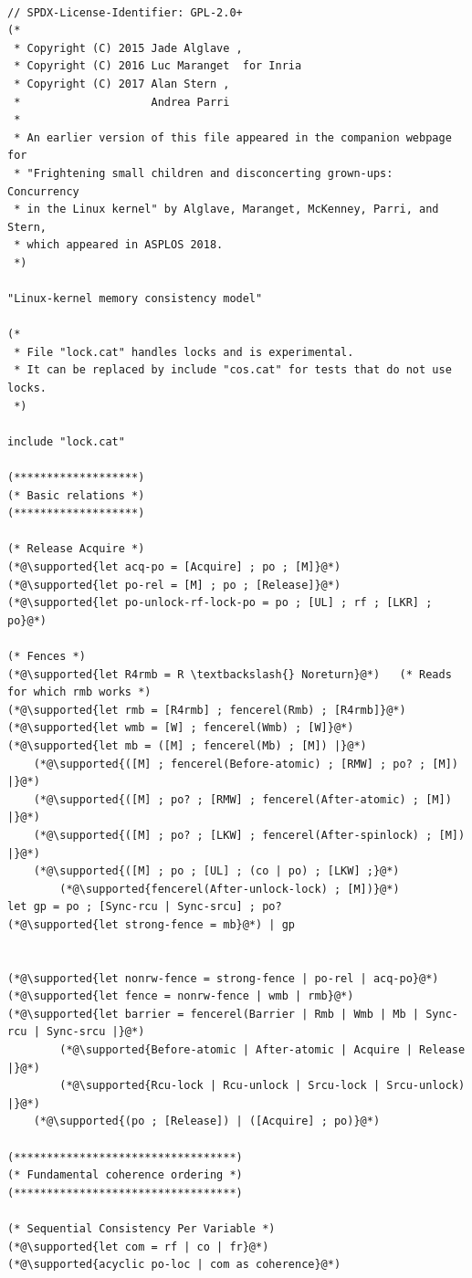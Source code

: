 \begin{lstlisting}

// SPDX-License-Identifier: GPL-2.0+
(*
 * Copyright (C) 2015 Jade Alglave ,
 * Copyright (C) 2016 Luc Maranget  for Inria
 * Copyright (C) 2017 Alan Stern ,
 *                    Andrea Parri
 *
 * An earlier version of this file appeared in the companion webpage for
 * "Frightening small children and disconcerting grown-ups: Concurrency
 * in the Linux kernel" by Alglave, Maranget, McKenney, Parri, and Stern,
 * which appeared in ASPLOS 2018.
 *)

"Linux-kernel memory consistency model"

(*
 * File "lock.cat" handles locks and is experimental.
 * It can be replaced by include "cos.cat" for tests that do not use locks.
 *)

include "lock.cat"

(*******************)
(* Basic relations *)
(*******************)

(* Release Acquire *)
(*@\supported{let acq-po = [Acquire] ; po ; [M]}@*)
(*@\supported{let po-rel = [M] ; po ; [Release]}@*)
(*@\supported{let po-unlock-rf-lock-po = po ; [UL] ; rf ; [LKR] ; po}@*)

(* Fences *)
(*@\supported{let R4rmb = R \textbackslash{} Noreturn}@*)	(* Reads for which rmb works *)
(*@\supported{let rmb = [R4rmb] ; fencerel(Rmb) ; [R4rmb]}@*)
(*@\supported{let wmb = [W] ; fencerel(Wmb) ; [W]}@*)
(*@\supported{let mb = ([M] ; fencerel(Mb) ; [M]) |}@*)
	(*@\supported{([M] ; fencerel(Before-atomic) ; [RMW] ; po? ; [M]) |}@*)
	(*@\supported{([M] ; po? ; [RMW] ; fencerel(After-atomic) ; [M]) |}@*)
	(*@\supported{([M] ; po? ; [LKW] ; fencerel(After-spinlock) ; [M]) |}@*)
	(*@\supported{([M] ; po ; [UL] ; (co | po) ; [LKW] ;}@*)
		(*@\supported{fencerel(After-unlock-lock) ; [M])}@*)
let gp = po ; [Sync-rcu | Sync-srcu] ; po?
(*@\supported{let strong-fence = mb}@*) | gp


(*@\supported{let nonrw-fence = strong-fence | po-rel | acq-po}@*)
(*@\supported{let fence = nonrw-fence | wmb | rmb}@*)
(*@\supported{let barrier = fencerel(Barrier | Rmb | Wmb | Mb | Sync-rcu | Sync-srcu |}@*)
		(*@\supported{Before-atomic | After-atomic | Acquire | Release |}@*)
		(*@\supported{Rcu-lock | Rcu-unlock | Srcu-lock | Srcu-unlock) |}@*)
	(*@\supported{(po ; [Release]) | ([Acquire] ; po)}@*)

(**********************************)
(* Fundamental coherence ordering *)
(**********************************)

(* Sequential Consistency Per Variable *)
(*@\supported{let com = rf | co | fr}@*)
(*@\supported{acyclic po-loc | com as coherence}@*)


\end{lstlisting}
